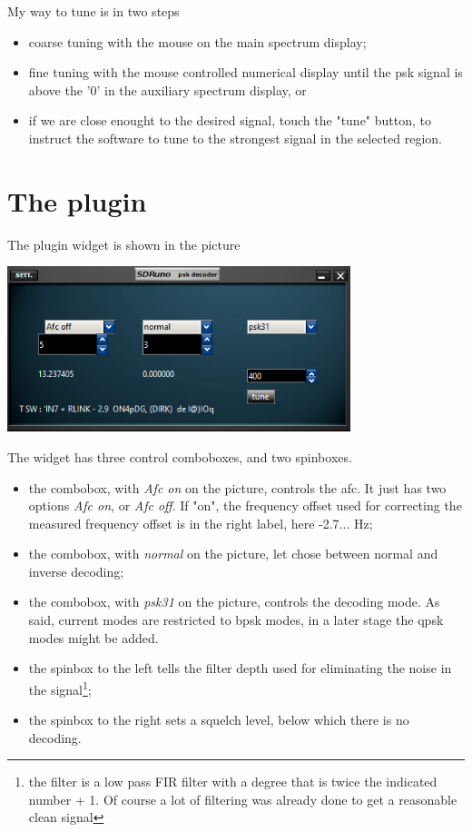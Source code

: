 \documentclass[11pt]{article}
\begin{document}
My way to tune is in two steps
\begin{itemize}
\item coarse tuning with the mouse on the main spectrum display;
\item fine tuning with the mouse controlled numerical display until the
psk signal is above the '0' in the auxiliary spectrum display, or
\item if we are close enought to the desired signal, 
touch the "tune" button, to instruct the software to tune to the
strongest signal in the selected region.
\end{itemize}

\section{The plugin}
The plugin widget  is shown in the picture

\includegraphics[width=100mm]{psk-plugin-widget.png}

The widget has three control comboboxes, and two spinboxes.

\begin{itemize}
\item the combobox, with {\em Afc on} on the picture, controls the afc. 
It just has two options {\em Afc on}, or {\em Afc off}. If "on", the
frequency offset used for correcting the measured frequency offset is
in the right label, here -2.7... Hz;
\item the combobox, with {\em normal} on the picture, let chose between
normal and inverse decoding;
\item the combobox, with {\em psk31} on the picture, controls the decoding mode.
As said, current modes are restricted to bpsk modes, in a later stage
the qpsk modes might be added.
\item the spinbox to the left tells the filter depth used for eliminating
the noise in the signal\footnote{the filter is a low pass FIR filter with
a degree that is twice the indicated number + 1. Of course a lot of filtering
was already done to get a reasonable clean signal};
\item the spinbox to the right sets a squelch level, below which there
is no decoding.
\end{itemize}
\end{document}
